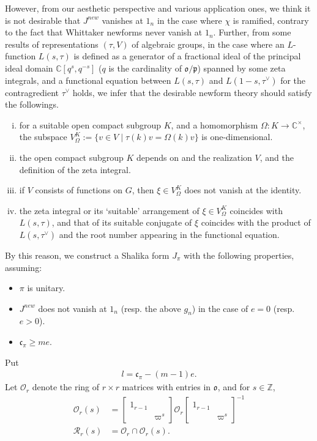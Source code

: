 \documentclass[11pt]{amsart}
\newcommand\Vp{\varpi}%
\newcommand\vp{\varphi}%
\newcommand\oo{\mathfrak{o}}
\newcommand\p{{\mathfrak{p}}}
\newcommand\cf{{\mathfrak{c}}}
\newcommand\C{{\mathbb{C}}}%
\newcommand\Z{{\mathbb{Z}}}
\newcommand\Oc{{\mathcal{O}}}
\newcommand\1{\mathbf{1}}
\newcommand\tm{\times}
\numberwithin{equation}{section}
\begin{document}
However, from our aesthetic perspective and various application ones, we think it is not desirable that $J^{new}$ vanishes at $1_n$ in the case where $\chi$ is ramified, contrary to the fact that Whittaker newforms never vanish at $1_n$.
Further, from some results of representations $(\tau,V)$ of algebraic groups, in the case where an $L$-function $L(s,\tau)$ is defined as a generator of a fractional ideal of the principal ideal domain $\C[q^{s},q^{-s}]$ ($q$ is the cardinality of $\oo/\p$) spanned by some zeta integrals, and a functional equation between $L(s,\tau)$ and $L(1-s,\tau^\vee)$ for the contragredient $\tau^\vee$ holds, we infer that the desirable newform theory should satisfy the followings.
\begin{enumerate}[i)]
\item for a suitable open compact subgroup $K$, and a homomorphism $\Omega: K \to \C^\tm$, the subspace $V^K_\Omega := \{v \in V \mid \tau(k)v = \Omega(k) v \}$ is one-dimensional.
\item the open compact subgroup $K$ depends on and the realization $V$, and the definition of the zeta integral.
\item if $V$ consists of functions on $G$, then $\xi \in V^K_\Omega$ does not vanish at the identity.
\item the zeta integral or its `suitable' arrangement of $\xi \in V^K_\Omega$ coincides with $L(s,\tau)$, and that of its suitable conjugate of $\xi$ coincides with the product of $L(s,\tau^\vee)$ and the root number appearing in the functional equation.
\end{enumerate}
By this reason, we construct a Shalika form $J_\pi$ with the following properties, assuming: 
\begin{itemize}
\item $\pi$ is unitary.
\item $J^{new}$ does not vanish at $1_n$ (resp. the above $g_n$) in the case of $e = 0$ (resp. $e>0$).
\item $\cf_\pi \ge me$. 
\end{itemize}
Put
\begin{align*}
l = \cf_\pi- (m-1)e. 
\end{align*}
Let $\Oc_r$ denote the ring of $r \tm r$ matrices with entries in $\oo$, and for $s \in \Z$, 
\begin{align*}
\Oc_r(s) &= \begin{bmatrix}
1_{r-1}&  \\
& \Vp^s
\end{bmatrix} \Oc_r \begin{bmatrix}
1_{r-1}&  \\
& \Vp^s
\end{bmatrix}^{-1}\\
\mathcal{R}_r(s) &= \Oc_r \cap \Oc_r(s).
\end{align*} 
\end{document}
